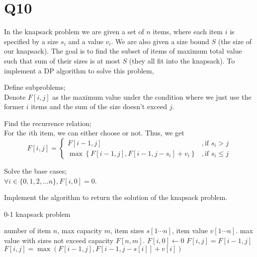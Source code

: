 \documentclass[a4paper,11pt]{article}
\begin{document}
\section*{Q10}
In the knapsack problem we are given a set of $n$ items, where
each item $i$ is speciﬁed by a size $s_i$ and a value $v_i$. We are also
given a size bound $S$ (the size of our knapsack). The goal is to
ﬁnd the subset of items of maximum total value such that sum
of their sizes is at most $S$ (they all ﬁt into the knapsack).
To implement a DP algorithm to solve this problem,
\begin{qparts}
    
    \item Deﬁne subproblems;\\
    Denote $F[i,j]$ as the maximum value under the condition where we just use the former $i$ items and the sum of the size doesn't exceed $j$.

    \item Find the recurrence relation;\\
    For the $i$th item, we can either choose or not. Thus, we get
    $$
    F[i,j]=
    \begin{cases}
        F[i-1,j]&,\text{if $s_i>j$}\\
        \max \left\{ F[i-1,j],F[i-1,j-s_i]+v_i \right\} &,\text{if $s_i\le j$}
    \end{cases}
    $$

    \item Solve the base cases;\\
    $\forall i \in \{ 0,1,2, \ldots n \},F[i,0]=0$.

    \item Implement the algorithm to return the solution of the
    knapsack problem.\\
    \begin{algorithm}
    \caption{0-1 knapsack problem}
        \begin{algorithmic}
            \Require number of item $n$, max capacity $m$, item sizes $s[1\cdots n]$, item value $v[1\cdots n]$.
            \Ensure max value with sizes not exceed capacity $F[n,m]$.
            \State $F[i,0]\gets 0$
            \EndFor
            \State $F[i,j]=F[i-1,j]$
            \Else
            \State $F[i,j]=\max\left( F[i-1,j],F[i-1,j-s[i]]+v[i] \right) $
            \EndIf
            \EndFor
            \EndFor
        \end{algorithmic}
    \end{algorithm}
\end{qparts}
\end{document}
